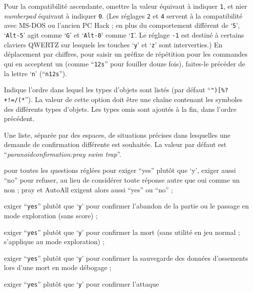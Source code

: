 \documentclass[titlepage]{article}
\begin{document}
\begin{description}[font=\mdseries\itshape]
Pour la compatibilité ascendante, omettre la valeur équivaut à indiquer \texttt{1},
et nier
\textit{number\textunderscore pad}
équivaut à indiquer \texttt{0}.
(Les réglages \texttt{2} et \texttt{4} servent à la compatibilité avec MS-DOS ou l'ancien PC Hack ;
en plus du comportement différent de `\texttt{5}', `\texttt{Alt-5}' agit comme `\texttt{G}'
et `\texttt{Alt-0}' comme `\texttt{I}'.
Le réglage \texttt{-1} est destiné à certains claviers QWERTZ sur lesquels les
touches `\texttt{y}' et `\texttt{z}' sont interverties.)
En déplacement par chiffres, pour saisir un préfixe de répétition pour les commandes
qui en acceptent un (comme ``\texttt{12s}'' pour fouiller douze fois), faites-le précéder
de la lettre `\texttt{n}' (``\texttt{n12s}'').
\item[packorder]
Indique l'ordre dans lequel les types d'objets sont listés (par défaut
``\texttt{")[\%?+!=/(*\textunderscore}''). La valeur de cette option doit être une chaîne
contenant les symboles des différents types d'objets. Les types omis
sont ajoutés à la fin, dans l'ordre précédent.
\item[paranoid\textunderscore confirmation]
Une liste, séparée par des espaces, de situations précises dans lesquelles une
demande de confirmation différente est souhaitée.
La valeur par défaut est ``\textit{paranoid\textunderscore confirmation:pray swim trap}''.
\newlength{\pcwidth}
\addtolength{\pcwidth}{\labelsep}
\begin{description}[leftmargin=\pcwidth, topsep=1mm, itemsep=0mm, labelwidth=*, font=\ttfamily, align=right]
\item[Confirm]
pour toutes les questions réglées pour exiger ``yes'' plutôt que `y',
exiger aussi ``no'' pour refuser, au lieu de considérer toute réponse autre que oui
comme un non ; pray et AutoAll exigent alors aussi ``yes'' ou ``no'' ;
\item[quit]
exiger ``\texttt{yes}'' plutôt que `\texttt{y}' pour confirmer l'abandon de
la partie ou le passage en mode exploration (sans score) ;
\item[die]
exiger ``\texttt{yes}'' plutôt que `\texttt{y}' pour confirmer la mort (sans
utilité en jeu normal ; s'applique au mode exploration) ;
\item[bones]
exiger ``\texttt{yes}'' plutôt que `\texttt{y}' pour confirmer la sauvegarde
des données d'ossements lors d'une mort en mode débogage ;
\item[attack]
exiger ``\texttt{yes}'' plutôt que `\texttt{y}' pour confirmer l'attaque

\end{description}
\end{description}
\end{document}
